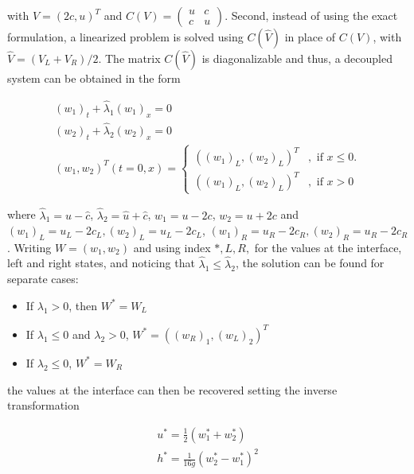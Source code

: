 \noindent with $V = (2c,u)^T$ and 
$C(V) = \left( 
\begin{array}{cc} 
u & c \\ 
c & u \end{array}\right)$. Second, instead of using the exact formulation, a linearized problem is solved using $C(\hat V)$ in place of $C(V)$, with $\hat V = (V_L +V_R)/2$. The matrix $C(\hat V)$ is diagonalizable and thus, a decoupled system can be obtained in the form

\begin{equation}
	\begin{split}
		(w_1)_t + \hat \lambda_1 (w_1)_x = 0\\
		(w_2)_t + \hat \lambda_2 (w_2)_x = 0 \\	
	(w_1,w_2)^T(t=0,x) = \begin{cases}
		((w_1)_L,(w_2)_L)^T &, \text{ if } x\leq 0. \\
		((w_1)_L,(w_2)_L)^T &, \text{ if } x > 0 
		\end{cases}
	\end{split}
\end{equation}

\noindent where $\hat \lambda_1 = \hat u - \hat c$, $\hat \lambda_2 = \hat u + \hat c$, $w_1 = u-2c$, $w_2 = u+2c$ and $ (w_1)_L = u_L - 2c_L, (w_2)_L = u_L - 2c_L$, $ (w_1)_R = u_R - 2c_R, (w_2)_R = u_R - 2c_R$. Writing $W=(w_1,w_2)$ and using index $*,L,R,$ for the values at the interface, left and right states, and noticing that $\hat \lambda_1 \leq \hat \lambda_2$, the solution can be found for separate cases:

\begin{itemize}
	\item If $\lambda_1 > 0$, then $W^* = W_L$
	\item If $\lambda_1 \leq 0 $ and $\lambda_2>0$, $W^* = ((w_R)_1, (w_L)_2)^T$
	\item If $\lambda_2\leq 0 $, $W^* = W_R$
\end{itemize}

\noindent the values at the interface can then be recovered setting the inverse transformation 

\begin{equation}
	\begin{split}
	u^* = \frac{1}{2}(w^*_1+w^*_2) \\
	h^* = \frac{1}{16g}(w^*_2-w^*_1)^2
	\end{split}	
	\label{serre:riemman_solution}
\end{equation}

